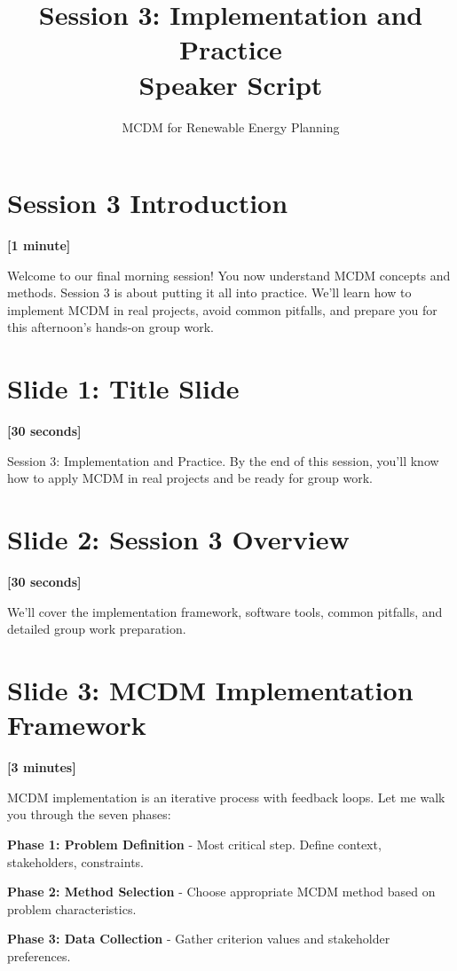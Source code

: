 \documentclass[12pt]{article}
\title{Session 3: Implementation and Practice\\Speaker Script}
\author{MCDM for Renewable Energy Planning}
\date{}
\begin{document}
\maketitle

\section*{Session 3 Introduction}
\textcolor{timing}{\textbf{[1 minute]}}

Welcome to our final morning session! You now understand MCDM concepts and methods. Session 3 is about putting it all into practice. We'll learn how to implement MCDM in real projects, avoid common pitfalls, and prepare you for this afternoon's hands-on group work.

\section*{Slide 1: Title Slide}
\textcolor{timing}{\textbf{[30 seconds]}}

Session 3: Implementation and Practice. By the end of this session, you'll know how to apply MCDM in real projects and be ready for group work.

\section*{Slide 2: Session 3 Overview}
\textcolor{timing}{\textbf{[30 seconds]}}

We'll cover the implementation framework, software tools, common pitfalls, and detailed group work preparation.

\section*{Slide 3: MCDM Implementation Framework}
\textcolor{timing}{\textbf{[3 minutes]}}

MCDM implementation is an iterative process with feedback loops. Let me walk you through the seven phases:

\textcolor{emphasis}{\textbf{Phase 1: Problem Definition}} - Most critical step. Define context, stakeholders, constraints.

\textcolor{emphasis}{\textbf{Phase 2: Method Selection}} - Choose appropriate MCDM method based on problem characteristics.

\textcolor{emphasis}{\textbf{Phase 3: Data Collection}} - Gather criterion values and stakeholder preferences.
\end{document}
